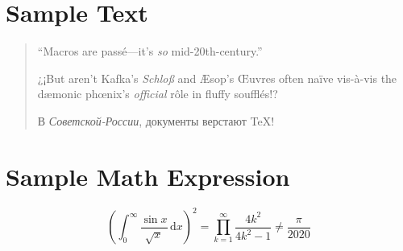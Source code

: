 \documentclass[a4paper]{article}
\begin{document}
\section{Sample Text}
\begin{quote}
  ``Macros are pass\'e---it's \emph{so} mid-20th-century.''

  ¿¡But aren’t Kafka’s \emph{Schloß} and Æsop’s Œuvres
  often naïve vis-à-vis the dæmonic phœnix’s
  \emph{official} rôle in fluffy soufflés!?

  \begin{RUS}
  В \emph{Советской-России}, документы верстают {\TeX}!
  \end{RUS}
\end{quote}

\section{Sample Math Expression}
\[
  \left( \int_0^\infty \frac{\sin x}{\sqrt x}\,\mathrm{d}x \right)^2 =
  \prod_{k=1}^\infty \frac{4k^2}{4k^2-1} \neq \frac{\pi}{2020}
\]
\end{document}
